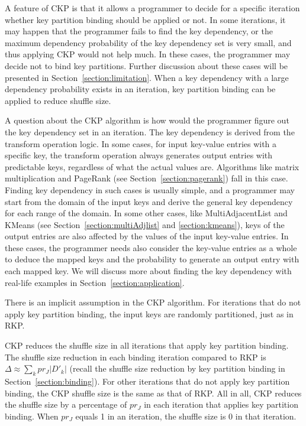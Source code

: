 \documentclass[10pt,journal,compsoc]{IEEEtran}
\begin{document}
A feature of CKP is that it allows a programmer to decide for a specific
iteration whether key partition binding should be applied or not.
In some iterations, it may happen that the programmer fails to find the
key dependency,
or the maximum dependency probability of the key dependency set is very small, 
and thus applying CKP would not help much.    
In these cases, the programmer may decide not to bind key partitions. 
Further discussion about these cases will be presented in Section~\ref{section:limitation}.
When a key dependency with a large dependency probability exists in an
iteration, key partition binding can be applied to reduce shuffle size.

A question about the CKP algorithm is how would the programmer figure
out the key dependency set in an iteration.
The key dependency is derived from the transform operation logic. 
In some cases, for input key-value entries with a specific key, 
the transform operation always generates output entries with predictable keys, 
regardless of what the actual values are. 
Algorithms like matrix multiplication and PageRank (see Section~\ref{section:pagerank}) fall in this case. 
Finding key dependency in such cases is usually simple, 
and a programmer may start from the domain of the input keys and 
derive the general key dependency for each range of the domain.
In some other cases, like MultiAdjacentList and KMeans (see Section~\ref{section:multiAdjlist} and \ref{section:kmeans}), keys of the output entries are also affected by 
the values of the input key-value entries. 
In these cases, the programmer needs also consider the key-value entries as 
a whole to deduce the mapped keys and the probability
to generate an output entry with each mapped key.
We will discuss more about finding the key dependency with real-life examples in Section~\ref{section:application}.

There is an implicit assumption in the CKP algorithm. 
For iterations that do not apply key partition binding, 
the input keys are randomly partitioned, just as in RKP.

CKP reduces the shuffle size in all iterations that apply key partition binding.
The shuffle size reduction in each binding iteration compared to RKP is
$ \Delta \approx \sum_k pr_J |D'_k|$ (recall the shuffle size
reduction by key partition binding in Section~\ref{section:binding}).
For other iterations that do not apply key partition binding, 
the CKP shuffle size is the same as that of RKP.
All in all, CKP reduces the shuffle size by a percentage of $pr_J$ in each 
iteration that applies key partition binding. 
When $pr_J$ equals 1 in an iteration, the shuffle size is 0 in that iteration.
\end{document}
